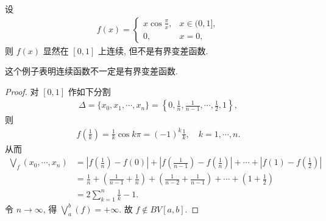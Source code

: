 \documentclass[../../main.tex]{subfiles}%
\begin{document}
\begin{example}
设
\begin{align*}
f(x) =
\begin{cases}
x\cos\frac{\pi}{x}, & x\in(0,1], \\
0, & x=0,
\end{cases}
\end{align*}
则 $f(x)$ 显然在 $[0,1]$ 上连续, 但不是有界变差函数.
\end{example}
\begin{remark}
这个例子表明连续函数不一定是有界变差函数.
\end{remark}
\begin{proof}

对 $[0,1]$ 作如下分割
\begin{align*}
\Delta = \{x_0, x_1, \cdots, x_n\} = \left\{0, \frac{1}{n}, \frac{1}{n-1}, \cdots, \frac{1}{2}, 1\right\},
\end{align*}
则
\begin{align*}
f\left(\frac{1}{k}\right) = \frac{1}{k}\cos k\pi = (-1)^k\frac{1}{k}, \quad k=1,\cdots,n.
\end{align*}
从而
\begin{align*}
\bigvee_f(x_0, \cdots, x_n) &= \left|f\left(\frac{1}{n}\right)-f(0)\right|+\left|f\left(\frac{1}{n-1}\right)-f\left(\frac{1}{n}\right)\right|+\cdots+\left|f(1)-f\left(\frac{1}{2}\right)\right| \\
&= \frac{1}{n} + \left(\frac{1}{n-1}+\frac{1}{n}\right) + \left(\frac{1}{n-2}+\frac{1}{n-1}\right) + \cdots + \left(1+\frac{1}{2}\right) \\
&= 2\sum_{k=1}^n \frac{1}{k} - 1.
\end{align*}
令 $n\to\infty$, 得 $\bigvee_a^b(f) = +\infty$. 故 $f\notin BV[a,b]$.

\end{proof}
\end{document}
